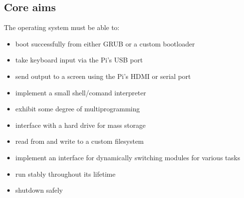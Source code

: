\documentclass[10pt,a4paper]{article}
\begin{document}
\subsection{Core aims}
The operating system must be able to:
\begin{itemize}
    \item boot successfully from either GRUB or a custom bootloader
    \item take keyboard input via the Pi's USB port
    \item send output to a screen using the Pi's HDMI or serial port
    \item implement a small shell/comand interpreter
    \item exhibit some degree of multiprogramming
    \item interface with a hard drive for mass storage
    \item read from and write to a custom filesystem
    \item implement an interface for dynamically switching modules for various
        tasks
    \item run stably throughout its lifetime
    \item shutdown safely
\end{itemize}
\end{document}
